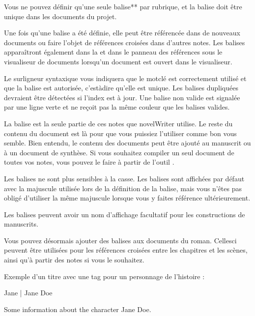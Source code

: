 \documentclass[a4paper,11pt,french]{sphinxmanual}
\begin{document}
\sphinxAtStartPar
Vous ne pouvez définir qu’une seule balise** par rubrique, et la balise doit être unique dans  les documents du projet.

\sphinxAtStartPar
Une fois qu’une balise a été définie, elle peut être référencée dans de nouveaux documents ou faire l’objet de références croisées dans d’autres notes. Les balises apparaîtront également dans la  et dans le panneau des références sous le visualiseur de documents lorsqu’un document est ouvert dans le visualiseur.

\sphinxAtStartPar
Le surligneur syntaxique vous indiquera que le mot\sphinxhyphen{}clé est correctement utilisé et que la balise est autorisée, c’est\sphinxhyphen{}à\sphinxhyphen{}dire qu’elle est unique. Les balises dupliquées devraient être détectées si l’index est à jour. Une balise non valide est signalée par une ligne verte et ne reçoit pas la même couleur que les balises valides.

\sphinxAtStartPar
La balise est la seule partie de ces notes que novelWriter utilise. Le reste du contenu du document est là pour que vous puissiez l’utiliser comme bon vous semble. Bien entendu, le contenu des documents peut être ajouté au manuscrit ou à un document de synthèse. Si vous souhaitez compiler un seul document de toutes vos notes, vous pouvez le faire à partir de l’outil .

\sphinxAtStartPar
{}Les balises ne sont plus sensibles à la casse. Les balises sont affichées par défaut avec la majuscule utilisée lors de la définition de la balise, mais vous n’êtes pas obligé d’utiliser la même majuscule lorsque vous y faites référence ultérieurement.

\sphinxAtStartPar
{}Les balises peuvent avoir un nom d’affichage facultatif pour les constructions de manuscrits.

\sphinxAtStartPar
{}Vous pouvez désormais ajouter des balises aux documents du roman. Celles\sphinxhyphen{}ci peuvent être utilisées pour les références croisées entre les chapitres et les scènes, ainsi qu’à partir des notes si vous le souhaitez.

\sphinxAtStartPar
Exemple d’un titre avec une tag pour un personnage de l’histoire :

\begin{sphinxVerbatim}[commandchars=\\\{\}]

 Jane | Jane Doe

Some information about the character Jane Doe.
\end{sphinxVerbatim}
\end{document}
